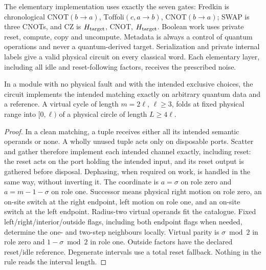 The elementary implementation uses exactly the seven gates:
Fredkin is chronological \(\mathrm{CNOT}(b\to a)\),
\(\mathrm{Toffoli}(c,a\to b)\), \(\mathrm{CNOT}(b\to a)\); SWAP is three CNOTs, and CZ is
\(H_{\rm target}\), CNOT, \(H_{\rm target}\). Boolean work uses private
reset, compute, copy and uncompute. Metadata is always a control of
quantum operations and never a quantum-derived target. Serialization
and private internal labels give a valid physical circuit on every
classical word. Each elementary layer, including all idle and
reset-following factors, receives the prescribed noise.

\begin{lemma}\label{f4:dispatch-clean}
In a module with no physical fault and with the intended exclusive
choices, the circuit implements the intended matching exactly on
arbitrary quantum data and a reference. A virtual cycle of length
\(m=2\ell\), \(\ell\ge3\), folds at fixed physical range into
\([0,\ell)\) of a physical circle of length \(L\ge4\ell\).
\end{lemma}
\begin{proof}
In a clean matching, a tuple receives either all its intended semantic
operands or none. A wholly unused tuple acts only on disposable ports.
Scatter and gather therefore implement each intended channel exactly,
including reset: the reset acts on the port holding the intended input,
and its reset output is gathered before disposal. Dephasing, when
required on work, is handled in the same way, without inverting it.
The coordinate is \(a=\sigma\) on role zero and
\(a=m-1-\sigma\) on role one. Successor means physical right motion
on role zero, an on-site switch at the right endpoint, left motion on
role one, and an on-site switch at the left endpoint. Radius-two virtual
operands fit the catalogue. Fixed left/right/interior/outside flags,
including both endpoint flags when needed, determine the one- and
two-step neighbours locally. Virtual parity is \(\sigma\bmod2\) in
role zero and \(1-\sigma\bmod2\) in role one. Outside factors have
the declared reset/idle reference. Degenerate intervals use a total
reset fallback. Nothing in the rule reads the interval length.
\end{proof}

